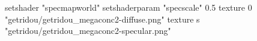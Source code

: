 setshader "specmapworld"
setshaderparam "specscale" 0.5
texture 0 "getridou/getridou_megaconc2-diffuse.png"
texture s "getridou/getridou_megaconc2-specular.png"
